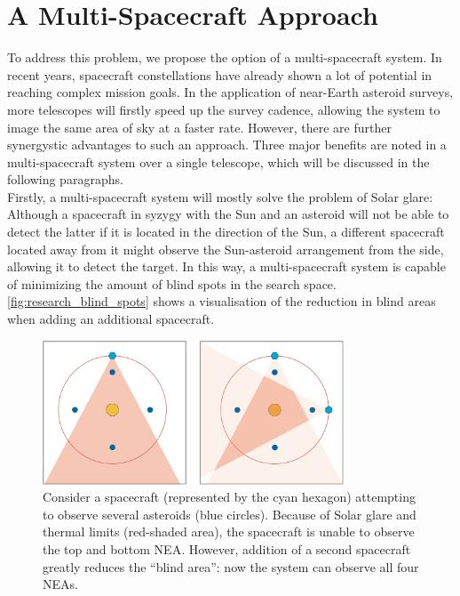 \section{A Multi-Spacecraft Approach}
\label{sec:researchmultispacecraft}
To address this problem, we propose the option of a multi-spacecraft system. In recent years, spacecraft constellations have already shown a lot of potential in reaching complex mission goals. In the application of near-Earth asteroid surveys, more telescopes will firstly speed up the survey cadence, allowing the system to image the same area of sky at a faster rate. However, there are further synergystic advantages to such an approach. Three major benefits are noted in a multi-spacecraft system over a single telescope, which will be discussed in the following paragraphs.\\

Firstly, a multi-spacecraft system will mostly solve the problem of Solar glare: Although a spacecraft in syzygy with the Sun and an asteroid will not be able to detect the latter if it is located in the direction of the Sun, a different spacecraft located away from it might observe the Sun-asteroid arrangement from the side, allowing it to detect the target. In this way, a multi-spacecraft system is capable of minimizing the amount of blind spots in the search space. \autoref{fig:research_blind_spots} shows a visualisation of the reduction in blind areas when adding an additional spacecraft.\\

\begin{figure}[htbp]
 \centering
 \includegraphics[width=0.8\textwidth]{img/research_blind_spots.png}
 \caption{Consider a spacecraft (represented by the cyan hexagon) attempting to observe several asteroids (blue circles). Because of Solar glare and thermal limits (red-shaded area), the spacecraft is unable to observe the top and bottom NEA. However, addition of a second spacecraft greatly reduces the ``blind area'': now the system can observe all four NEAs.}
 \label{fig:research_blind_spots}
\end{figure}


